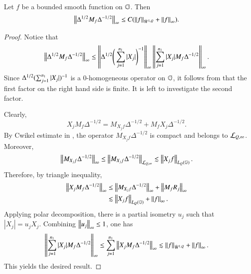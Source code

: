 \documentclass[leqno]{amsart}
\begin{document}
	
	
	\begin{lemma}\label{modulus}
		Let $f$ be a bounded smooth function on $\mathbb{G}$. Then
		\begin{align*}
			\left\| \Delta^{1/2}M_{f}\Delta^{-1/2} \right\|_{\infty}
			\leq C(\left\| f \right\|_{\dot{W}^{1,Q}}+\left\| f \right\|_{\infty}).
		\end{align*}
	\end{lemma}
	\begin{proof}
		Notice that
		\begin{align*}
			\left\| \Delta^{1/2}M_{f}\Delta^{-1/2} \right\|_{\infty}
			\leq\left\| \Delta^{1/2}\Bigg(\sum_{j=1}^{n_{1}}|X_{j}|\Bigg)^{-1} \right\|_{\infty}
			\left\| \sum_{j=1}^{n_{1}}|X_{j}|M_{f}\Delta^{-1/2} \right\|_{\infty}.
		\end{align*}
		Since $\Delta^{1/2}(\sum_{j=1}^{n_{1}}|X_{j}|)^{-1}$ is a 0-homogeneous operator on $\mathbb{G}$, it follows from \cite[Theorem 3.2.30]{FR-Book} that the first factor on the right hand side is finite.
		It is left to investigate the second factor.
		
		Clearly, $$X_{j}M_{f}\Delta^{-1/2}=M_{X_{j}f}\Delta^{-1/2}+M_{f}X_{j}\Delta^{-1/2}.$$
		By Cwikel estimate in \cite{MSZ-Cwikel}, the operator $M_{X_{j}f}\Delta^{-1/2}$ is compact and belongs to ${\mathcal L}_{Q,\infty}$. Moreover,
		\begin{align*}
			\left\| M_{X_{j}f}\Delta^{-1/2} \right\|_{\infty}
			\leq\left\| M_{X_{j}f}\Delta^{-1/2} \right\|_{{\mathcal L}_{Q,\infty}}
			\lesssim\left\| X_{j}f \right\|_{L_{Q}(\mathbb{G})}.
		\end{align*}
		Therefore, by triangle inequality,
		\begin{align*}
			\left\| X_{j}M_{f}\Delta^{-1/2} \right\|_{\infty}
			&\leq\left\| M_{X_{j}f}\Delta^{-1/2} \right\|_{\infty}+\left\| M_{f}R_{j} \right\|_{\infty}\\
			&\lesssim\left\| X_{j}f \right\|_{L_{Q}(\mathbb{G})}+\left\| f \right\|_{\infty}.
		\end{align*}
		Applying polar decomposition, there is a partial isometry $u_{j}$ such that $|X_{j}|=u_{j}X_{j}$.
		Combining $\left\| u_{j} \right\|_{\infty}\leq1$, one has
		\begin{align*}
			\left\| \sum_{j=1}^{n_{1}}|X_{j}|M_{f}\Delta^{-1/2} \right\|_{\infty}
			\leq\sum_{j=1}^{n_{1}}\left\| X_{j}M_{f}\Delta^{-1/2} \right\|_{\infty}
			\lesssim\left\| f \right\|_{\dot{W}^{1,Q}}+\left\| f \right\|_{\infty}.
		\end{align*}
		This yields the desired result.
	\end{proof}
	
	
	
	
	
\end{document}
